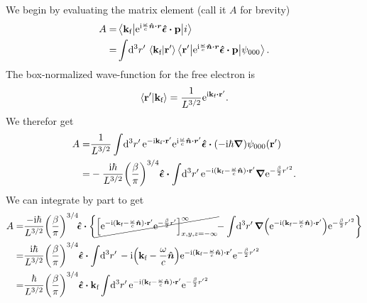 \documentclass[11pt,letter, swedish, english
]{article}
\begin{document}
We begin by evaluating the matrix element (call it $A$ for brevity)
\begin{equation}
\begin{aligned}
A=&\mel**{\vkf}{\ee^{\ii\frac{\omega}{c}\vu*{n}\vdot\vb*{r}}
\vu*{\epsilon}\vdot\vb{p}}{i}\\
=&\int\!\rd^3r'\,
\ip{\vkf}{\vb{r}'}
\mel**{\vb{r}'}{\ee^{\ii\frac{\omega}{c}\vu*{n}\vdot\vb*{r}}
\vu*{\epsilon}\vdot\vb{p}}{\psi_{000}}.
\end{aligned}
\end{equation}
The box-normalized wave-function for the free electron is
\begin{equation}
\ip{\vb{r}'}{\vkf}=\frac{1}{L^{3/2}}\ee^{\ii\vkf\vdot\vb{r}'}.
\end{equation}
We therefor get
\begin{equation}
\begin{aligned}
A=&\frac{1}{L^{3/2}}\int\!\rd^3r'\,
\ee^{-\ii\vkf\vdot\vb{r}'}
\ee^{\ii\frac{\omega}{c}\vu*{n}\vdot\vb*{r}'}
\vu*{\epsilon}\vdot(-\ii\hbar\grad)\psi_{000}(\vb{r}')\\
=&-\frac{\ii\hbar}{L^{3/2}} \qty(\frac{\beta}{\pi})^{3/4}
\vu*{\epsilon}\vdot\int\!\rd^3r'\,
\ee^{-\ii(\vkf-\frac{\omega}{c}\vu*{n})\vdot\vb{r}'}
\grad\ee^{-\frac{\beta}{2}{r'}^2}.
\end{aligned}
\end{equation}
We can integrate by part to get
\begin{equation}
\begin{aligned}
A=&\frac{-\ii\hbar}{L^{3/2}} \qty(\frac{\beta}{\pi})^{3/4}
\!\vu*{\epsilon}\vdot\qty{
\cancel{\qty[\ee^{-\ii(\vkf-\frac{\omega}{c}\vu*{n})\vdot\vb{r}'}
\ee^{-\frac{\beta}{2}r'}]_{x,y,z=-\infty}^\infty}
\!\!-\int\!\rd^3r'\,
\grad\qty(\ee^{-\ii(\vkf-\frac{\omega}{c}\vu*{n})\vdot\vb{r}'})
\ee^{-\frac{\beta}{2}{r'}^2}}\\
=&\frac{\ii\hbar}{L^{3/2}} \qty(\frac{\beta}{\pi})^{3/4}
\vu*{\epsilon}\vdot\int\!\rd^3r'\,
-\ii\qty(\vkf-\frac{\omega}{c}\vu*{n})
\ee^{-\ii(\vkf-\frac{\omega}{c}\vu*{n})\vdot\vb{r}'}
\ee^{-\frac{\beta}{2}{r'}^2}\\
=&\frac{\hbar}{L^{3/2}} \qty(\frac{\beta}{\pi})^{3/4}
\vu*{\epsilon}\vdot\vkf\int\!\rd^3r'\,
\ee^{-\ii(\vkf-\frac{\omega}{c}\vu*{n})\vdot\vb{r}'}
\ee^{-\frac{\beta}{2}{r'}^2}\\
\end{aligned}
\end{equation}
\end{document}
